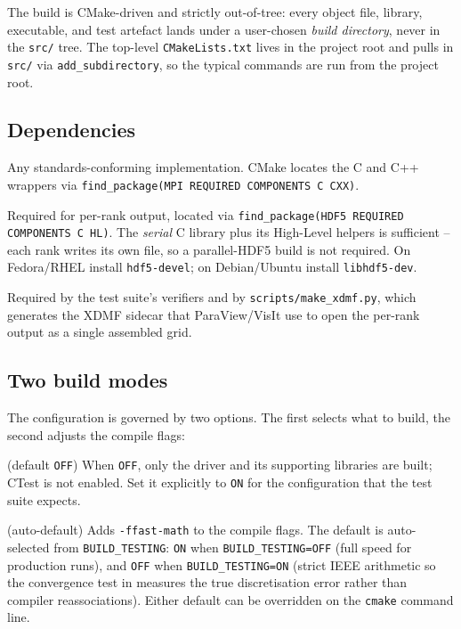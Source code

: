 \documentclass[11pt]{article}
\theoremstyle{definition}
\begin{document}
The build is CMake-driven and strictly out-of-tree: every object file,
library, executable, and test artefact lands under a user-chosen
\emph{build directory}, never in the \texttt{src/} tree.  The
top-level \texttt{CMakeLists.txt} lives in the project root and pulls
in \texttt{src/} via \verb|add_subdirectory|, so the typical commands
are run from the project root.

\subsection{Dependencies}\label{sec:build-deps}
\begin{description}[leftmargin=2em,style=nextline]
\item[MPI] Any standards-conforming implementation.  CMake locates the
  C and C++ wrappers via \verb|find_package(MPI REQUIRED COMPONENTS C CXX)|.
\item[HDF5] Required for per-rank output, located via
  \verb|find_package(HDF5 REQUIRED COMPONENTS C HL)|.  The \emph{serial}
  C library plus its High-Level helpers is sufficient -- each rank
  writes its own file, so a parallel-HDF5 build is not required.  On
  Fedora/RHEL install \texttt{hdf5-devel}; on Debian/Ubuntu install
  \texttt{libhdf5-dev}.
\item[Python 3 + h5py + numpy] Required by the test suite's verifiers
  and by \texttt{scripts/make\_xdmf.py}, which generates the XDMF
  sidecar that ParaView/VisIt use to open the per-rank output as a
  single assembled grid.
\end{description}

\subsection{Two build modes}\label{sec:build-modes}
The configuration is governed by two options.  The first selects what
to build, the second adjusts the compile flags:

\begin{description}[leftmargin=3em,style=nextline]
\item[\texttt{BUILD\_TESTING}] (default \texttt{OFF})
  When \texttt{OFF}, only the driver and its supporting libraries are
  built; CTest is not enabled.  Set it explicitly to \texttt{ON} for
  the configuration that the test suite expects.

\item[\texttt{MULTIGRID\_FAST\_MATH}] (auto-default)
  Adds \texttt{-ffast-math} to the compile flags.  The default is
  auto-selected from \texttt{BUILD\_TESTING}:
  \texttt{ON} when \texttt{BUILD\_TESTING=OFF} (full speed for
  production runs), and \texttt{OFF} when \texttt{BUILD\_TESTING=ON}
  (strict IEEE arithmetic so the convergence test in
   measures the true discretisation error rather
  than compiler reassociations).  Either default can be overridden
  on the \texttt{cmake} command line.
\end{description}
\end{document}
